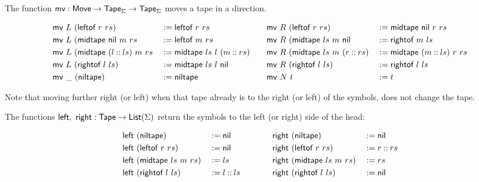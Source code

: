 The function $\textsf{mv} : \textsf{Move} \rightarrow \textsf{Tape}_\Sigma \rightarrow \textsf{Tape}_\Sigma$ moves a tape in a direction.
\begin{definition}
  \footnotesize
  \begin{alignat*}{4}
    & \textsf{mv}~L~(\textsf{leftof}~r~rs)               &&:= \textsf{leftof}~r~rs
    &~~~&
      \textsf{mv}~R~(\textsf{leftof}~r~rs)               &&:= \textsf{midtape}~\textsf{nil}~r~rs \\
    & \textsf{mv}~L~(\textsf{midtape}~\textsf{nil}~m~rs          &&:= \textsf{leftof}~m~rs
    && \textsf{mv}~R~(\textsf{midtape}~ls~m~\textsf{nil}         &&:= \textsf{rightof}~m~ls \\
    & \textsf{mv}~L~(\textsf{midtape}~(l \mathbin{::} ls)~m~rs  &&:= \textsf{midtape}~ls~l~(m \mathbin{::} rs)
    && \textsf{mv}~R~(\textsf{midtape}~ls~m~(r \mathbin{::} rs) &&:= \textsf{midtape}~(m \mathbin{::} ls)~r~rs \\
    & \textsf{mv}~L~(\textsf{rightof}~l~ls)              &&:= \textsf{midtape}~ls~l~\textsf{nil}
    && \textsf{mv}~R~(\textsf{rightof}~l~ls)             &&:= \textsf{rightof}~l~ls \\
    & \textsf{mv}~\_~(\textsf{niltape})                  &&:= \textsf{niltape}
    && \textsf{mv}~N~t                               &&:= t
  \end{alignat*}
\end{definition}
Note that moving further right (or left) when that tape already is to the right (or left) of the symbols, does not change the tape.

The functions $\textsf{left},~\textsf{right} : \textsf{Tape} \rightarrow \textsf{List}(\Sigma)$ return the symbols to the left (or right) side of the head:
\begin{definition}
  \begin{alignat*}{4}
    \textsf{left} &~(\textsf{niltape})                 &&:= \textsf{nil}
    \quad\quad\quad\quad
    & \textsf{right}&~(\textsf{niltape})               &&:= \textsf{nil} \\
    \textsf{left} &~(\textsf{leftof}~{r}~{rs})         &&:= \textsf{nil}
    & \textsf{right}&~(\textsf{leftof}~{r}~{rs})       &&:= r \mathbin{::} rs \\
    \textsf{left} &~(\textsf{midtape}~{ls}~{m}~{rs})   &&:= ls
    & \textsf{right}&~(\textsf{midtape}~{ls}~{m}~{rs}) &&:= rs \\
    \textsf{left} &~(\textsf{rightof}~{l}~{ls})        &&:= l \mathbin{::} ls
    & \textsf{right}&~(\textsf{rightof}~{l}~{ls})      &&:= \textsf{nil}
  \end{alignat*}
\end{definition}

